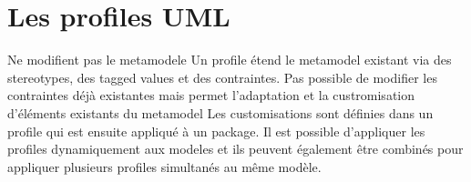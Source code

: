 \chapter{Les profiles UML}

Ne modifient pas le metamodele
Un profile étend le metamodel existant via des stereotypes, des tagged values et des contraintes.
Pas possible de modifier les contraintes déjà existantes mais permet l'adaptation et la custromisation d'éléments existants du metamodel
Les customisations sont définies dans un profile qui est ensuite appliqué à un package.
Il est possible d'appliquer les profiles dynamiquement aux modeles et ils peuvent également être combinés pour appliquer plusieurs profiles simultanés au même modèle.